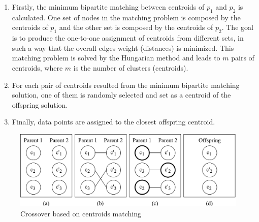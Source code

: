 \begin{enumerate}
	\item Firstly, the minimum bipartite matching between centroids of $p_1$ and $p_2$ is calculated. One set of nodes in the matching problem is composed by the centroids of $p_1$ and the other set is composed by the centroids of $p_2$. The goal is to produce the one-to-one assignment of centroids from different sets, in such a way that the overall edges weight (distances) is minimized. This matching problem is solved by the Hungarian method \cite{Kuhn1955} and leads to $m$ pairs of centroids, where $m$ is the number of clusters (centroids).

	\item For each pair of centroids resulted from the minimum bipartite matching solution, one of them is randomly selected and set as a centroid of the offspring solution.

	\item Finally, data points are assigned to the closest offspring centroid.
\end{enumerate}

\begin{figure}[H]
  \begin{center}
    \includegraphics[width=1.0\textwidth]{img/crossover}
    \caption{Crossover based on centroids matching}\label{fig:crossover}
  \end{center}
\end{figure}



